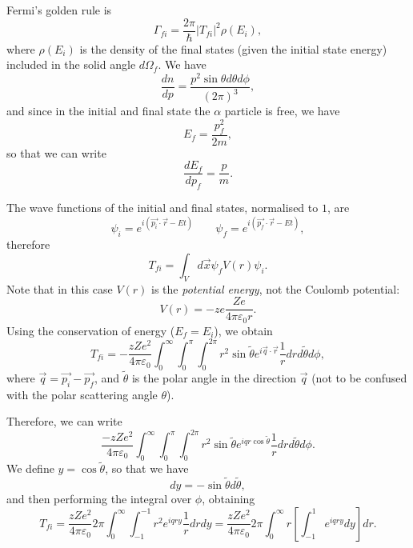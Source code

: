 Fermi's golden rule is
\begin{equation*}
\Gamma_{fi} = \frac{2\pi}{\hslash} |T_{fi}|^2 \rho(E_i),
\end{equation*}
where $\rho(E_{i})$ is the density of the final states (given the initial state energy) included in the solid angle $d\Omega_f$. We have
\begin{equation*}
    \frac{dn}{dp} = \frac{p^2\sin{\theta}d\theta d\phi}{(2\pi)^3},
\end{equation*}
and since in the initial and final state the $\alpha$ particle is free, we have
\begin{equation*}
    E_{f} = \frac{p_f^2}{2m},
\end{equation*}
so that we can write
\begin{equation*}
    \frac{dE_f}{dp_f} = \frac{p}{m}.
\end{equation*}

The wave functions of the initial and final states, normalised to $1$, are
\begin{equation*}
    \psi_i = e^{i(\Vec{p_i}\cdot\Vec{r} - Et)}\;\;\;\;\;\;\;\psi_f = e^{i(\Vec{p_f}\cdot\Vec{r}-Et)},
\end{equation*}
therefore
\begin{equation*}
    T_{fi} = \int_{V}d\Vec{x} \psi_{f} V(r)\psi_i.
\end{equation*}
Note that in this case $V(r)$ is the \emph{potential energy}, not the Coulomb potential:
\begin{equation*}
    V(r) = -ze\frac{Ze}{4\pi\varepsilon_0 r}.
\end{equation*}
Using the conservation of energy ($E_f=E_i$), we obtain
\begin{equation*}
    T_{fi} = -\frac{zZe^2}{4\pi\varepsilon_0}\int_{0}^{\infty}\int_{0}^{\pi}\int_{0}^{2\pi}r^2\sin{\tilde{\theta}}e^{i\Vec{q}\cdot\Vec{r}}\frac{1}{r}drd\tilde{\theta}d\phi,
\end{equation*}
where $\Vec{q} = \Vec{p_i} - \Vec{p_f}$, and $\tilde{\theta}$ is the polar angle in the direction $\Vec{q}$ (not to be confused with the polar scattering angle $\theta$).

Therefore, we can write
\begin{equation*}
    \frac{-zZe^2}{4\pi\varepsilon_0}\int_{0}^{\infty}\int_{0}^{\pi}\int_{0}^{2\pi}r^2\sin{\tilde{\theta}}e^{iqr\cos\tilde{\theta}}\frac{1}{r}drd\tilde{\theta}d\phi.
\end{equation*}
We define $y = \cos{\tilde{\theta}}$, so that we have
\begin{equation*}
    dy = -\sin{\tilde{\theta}}d\tilde{\theta},
\end{equation*}
and then performing the integral over $\phi$, obtaining
\begin{equation*}
    T_{fi} = \frac{zZe^2}{4\pi\varepsilon_0}2\pi\int_{0}^{\infty}\int_{-1}^{-1}r^2e^{iqry}\frac{1}{r}drdy = \frac{zZe^2}{4\pi\varepsilon_0}2\pi\int_{0}^{\infty}r\left[\int_{-1}^{1}e^{iqry}dy\right]dr.
\end{equation*}

